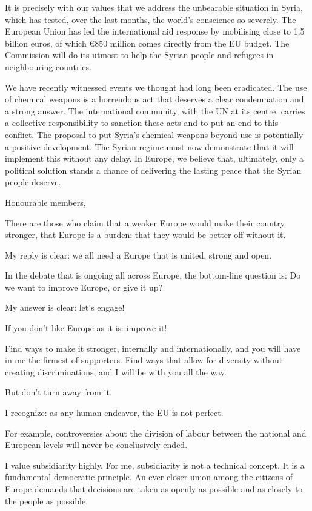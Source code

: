 \documentclass[a4paper,11pt]{article}
\begin{document}
It is precisely with our values that we address the unbearable situation in Syria, which has tested, over the last months, the world's conscience so severely. The European Union has led the international aid response by mobilising close to 1.5 billion euros, of which \euro850 million comes directly from the EU budget. The Commission will do its utmost to help the Syrian people and refugees in neighbouring countries.

We have recently witnessed events we thought had long been eradicated. The use of chemical weapons is a horrendous act that deserves a clear condemnation and a strong answer. The international community, with the UN at its centre, carries a collective responsibility to sanction these acts and to put an end to this conflict. The proposal to put Syria's chemical weapons beyond use is potentially a positive development. The Syrian regime must now demonstrate that it will implement this without any delay. In Europe, we believe that, ultimately, only a political solution stands a chance of delivering the lasting peace that the Syrian people deserve.

Honourable members,

There are those who claim that a weaker Europe would make their country stronger, that Europe is a burden; that they would be better off without it.

My reply is clear: we all need a Europe that is united, strong and open.

In the debate that is ongoing all across Europe, the bottom-line question is: Do we want to improve Europe, or give it up?

My answer is clear: let's engage!

If you don't like Europe as it is: improve it!

Find ways to make it stronger, internally and internationally, and you will have in me the firmest of supporters. Find ways that allow for diversity without creating discriminations, and I will be with you all the way.

But don't turn away from it.

I recognize: as any human endeavor, the EU is not perfect.

For example, controversies about the division of labour between the national and European levels will never be conclusively ended.

I value subsidiarity highly. For me, subsidiarity is not a technical concept. It is a fundamental democratic principle. An ever closer union among the citizens of Europe demands that decisions are taken as openly as possible and as closely to the people as possible.
\end{document}
